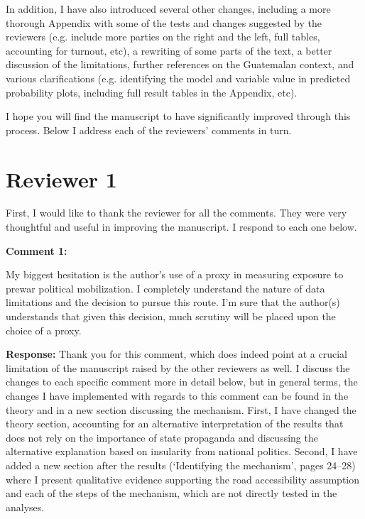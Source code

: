 \documentclass[12pt, a4paper, notitlepage]{article}
\begin{document}
In addition, I have also introduced several other changes, including a more thorough Appendix with some of the tests and changes suggested by the reviewers (e.g. include more parties on the right and the left, full tables, accounting for turnout, etc), a rewriting of some parts of the text, a better discussion of the limitations, further references on the Guatemalan context, and various clarifications (e.g. identifying the model and variable value in predicted probability plots, including full result tables in the Appendix, etc).

I hope you will find the manuscript to have significantly improved through this process.
Below I address each of the reviewers' comments in turn.

\newpage
\section*{Reviewer 1}

First, I would like to thank the reviewer for all the comments. They were very thoughtful and useful in improving the manuscript. I respond to each one below.

\vspace{15pt}
\noindent\textbf{Comment 1:}
\begin{displayquote}
My biggest hesitation is the author’s use of a proxy in measuring exposure to prewar political mobilization. I completely understand the nature of data limitations and the decision to pursue this route. I’m sure that the author(s) understands that given this decision, much scrutiny will be placed upon the choice of a proxy.
\end{displayquote}

\noindent\textbf{Response:} Thank you for this comment, which does indeed point at a crucial limitation of the manuscript raised by the other reviewers as well.
I discuss the changes to each specific comment more in detail below, but in general terms, the changes I have implemented with regards to this comment can be found in the theory and in a new section discussing the mechanism.
First, I have changed the theory section, accounting for an alternative interpretation of the results that does not rely on the importance of state propaganda and discussing the alternative explanation based on insularity from national politics.
Second, I have added a new section after the results (`Identifying the mechanism', pages 24--28) where I present qualitative evidence supporting the road accessibility assumption and each of the steps of the mechanism, which are not directly tested in the analyses.
\end{document}
